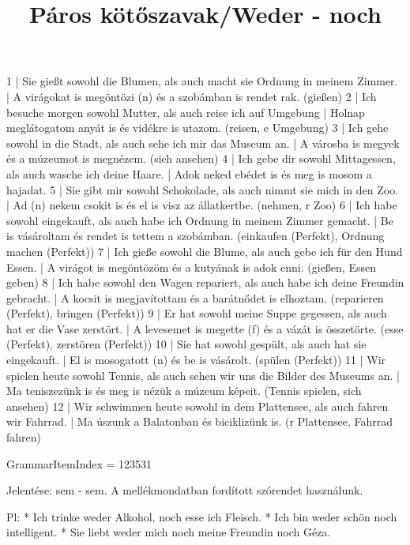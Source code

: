 \begin{exmp}
1 | Sie gießt sowohl die Blumen, als auch macht sie Ordnung in meinem Zimmer. | A virágokat is megöntözi (n) és a szobámban is rendet rak. (gießen)
2 | Ich besuche morgen sowohl Mutter, als auch reise ich auf Umgebung | Holnap meglátogatom anyát is és vidékre is utazom. (reisen, e Umgebung)
3 | Ich gehe sowohl in die Stadt, als auch sehe ich mir das Museum an. | A városba is megyek és a múzeumot is megnézem. (sich ansehen)
4 | Ich gebe dir sowohl Mittagessen, als auch wasche ich deine Haare. | Adok neked ebédet is és meg is mosom a hajadat.
5 | Sie gibt mir sowohl Schokolade, als auch nimmt sie mich in den Zoo. | Ad (n) nekem csokit is és el is visz az állatkertbe. (nehmen, r Zoo)
6 | Ich habe sowohl eingekauft, als auch habe ich Ordnung in meinem Zimmer gemacht. | Be is vásároltam és rendet is tettem a szobámban. (einkaufen (Perfekt), Ordnung machen (Perfekt))
7 | Ich gieße sowohl die Blume, als auch gebe ich für den Hund Essen. | A virágot is megöntözöm és a kutyának is adok enni. (gießen, Essen geben)
8 | Ich habe sowohl den Wagen repariert, als auch habe ich deine Freundin gebracht. | A kocsit is megjavítottam és a barátnődet is elhoztam. (reparieren (Perfekt), bringen (Perfekt))
9 | Er hat sowohl meine Suppe gegessen, als auch hat er die Vase zerstört. | A levesemet is megette (f) és a vázát is összetörte. (esse (Perfekt), zerstören (Perfekt))
10 | Sie hat sowohl gespült, als auch hat sie eingekauft. | El is mosogatott (n) és be is vásárolt. (spülen (Perfekt))
11 | Wir spielen heute sowohl Tennis, als auch sehen wir uns die Bilder des Museums an. | Ma teniszezünk is és meg is nézük a múzeum képeit. (Tennis spielen, sich ansehen)
12 | Wir schwimmen heute sowohl in dem Plattensee, als auch fahren wir Fahrrad. | Ma úszunk a Balatonban és biciklizünk is. (r Plattensee, Fahrrad fahren)
\end{exmp}

\title{Páros kötőszavak/Weder - noch}

GrammarItemIndex = 123531

\begin{desc}
Jelentése: sem - sem.
A mellékmondatban fordított szórendet használunk.

Pl: * Ich trinke weder Alkohol, noch esse ich Fleisch.
* Ich bin weder schön noch intelligent.
* Sie liebt weder mich noch meine Freundin noch Géza.
\end{desc}

